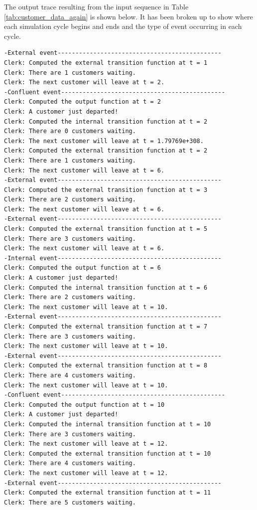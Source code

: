 The output trace resulting from the input sequence in Table \ref{tab:customer_data_again} is shown below. It has been broken up to show where each simulation cycle begins and ends and the type of event occurring in each cycle.
\begin{verbatim}
-External event----------------------------------------------
Clerk: Computed the external transition function at t = 1
Clerk: There are 1 customers waiting.
Clerk: The next customer will leave at t = 2.
-Confluent event----------------------------------------------
Clerk: Computed the output function at t = 2
Clerk: A customer just departed!
Clerk: Computed the internal transition function at t = 2
Clerk: There are 0 customers waiting.
Clerk: The next customer will leave at t = 1.79769e+308.
Clerk: Computed the external transition function at t = 2
Clerk: There are 1 customers waiting.
Clerk: The next customer will leave at t = 6.
-External event----------------------------------------------
Clerk: Computed the external transition function at t = 3
Clerk: There are 2 customers waiting.
Clerk: The next customer will leave at t = 6.
-External event----------------------------------------------
Clerk: Computed the external transition function at t = 5
Clerk: There are 3 customers waiting.
Clerk: The next customer will leave at t = 6.
-Internal event----------------------------------------------
Clerk: Computed the output function at t = 6
Clerk: A customer just departed!
Clerk: Computed the internal transition function at t = 6
Clerk: There are 2 customers waiting.
Clerk: The next customer will leave at t = 10.
-External event----------------------------------------------
Clerk: Computed the external transition function at t = 7
Clerk: There are 3 customers waiting.
Clerk: The next customer will leave at t = 10.
-External event----------------------------------------------
Clerk: Computed the external transition function at t = 8
Clerk: There are 4 customers waiting.
Clerk: The next customer will leave at t = 10.
-Confluent event----------------------------------------------
Clerk: Computed the output function at t = 10
Clerk: A customer just departed!
Clerk: Computed the internal transition function at t = 10
Clerk: There are 3 customers waiting.
Clerk: The next customer will leave at t = 12.
Clerk: Computed the external transition function at t = 10
Clerk: There are 4 customers waiting.
Clerk: The next customer will leave at t = 12.
-External event----------------------------------------------
Clerk: Computed the external transition function at t = 11
Clerk: There are 5 customers waiting.

\end{verbatim}
